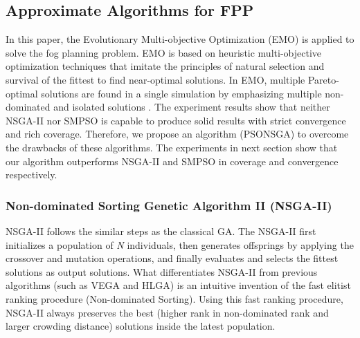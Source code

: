 \documentclass[10pt,journal,compsoc]{IEEEtran}
\begin{document}

\subsection{Approximate Algorithms for FPP}\label{sec:approximate}
In this paper, the Evolutionary Multi-objective Optimization (EMO) is applied to solve the fog planning problem. EMO is based on heuristic multi-objective optimization techniques that imitate the principles of natural selection and survival of the fittest to find near-optimal solutions. In EMO, multiple Pareto-optimal solutions are found in a single simulation by emphasizing multiple non-dominated and isolated solutions \cite{Deb:2001:MOU:559152}. %
The experiment results show that neither NSGA-II nor SMPSO is capable to produce solid results with strict convergence and rich coverage. Therefore, we propose an algorithm (PSONSGA) to overcome the drawbacks of these algorithms. The experiments in next section show that our algorithm outperforms NSGA-II and SMPSO in coverage and convergence respectively.
\subsubsection{Non-dominated Sorting Genetic Algorithm II (NSGA-II)}
NSGA-II follows the similar steps as the classical GA. 
The NSGA-II first initializes a population of \textit{N} individuals, then generates offsprings by applying the crossover and mutation operations, and finally evaluates and selects the fittest solutions as output solutions. What differentiates NSGA-II from previous algorithms (such as VEGA and HLGA) is an intuitive invention of the fast elitist ranking procedure (Non-dominated Sorting). Using this fast ranking procedure, NSGA-II always preserves the best (higher rank in non-dominated rank and larger crowding distance) solutions inside the latest population. 
\end{document}
